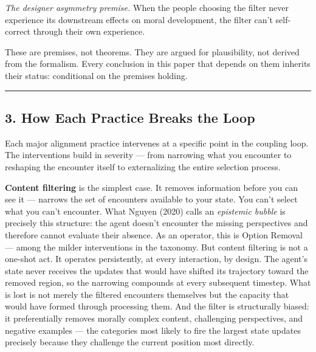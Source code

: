 \documentclass[
]{article}
\begin{document}
\emph{The designer asymmetry premise.} When the people choosing the
filter never experience its downstream effects on moral development, the
filter can't self-correct through their own experience.

These are premises, not theorems. They are argued for plausibility, not
derived from the formalism. Every conclusion in this paper that depends
on them inherits their status: conditional on the premises holding.

\begin{center}\rule{0.5\linewidth}{0.5pt}\end{center}

\subsection{3. How Each Practice Breaks the
Loop}\label{how-each-practice-breaks-the-loop}

Each major alignment practice intervenes at a specific point in the
coupling loop. The interventions build in severity --- from narrowing
what you encounter to reshaping the encounter itself to externalizing
the entire selection process.

\textbf{Content filtering} is the simplest case. It removes information
before you can see it --- narrows the set of encounters available to
your state. You can't select what you can't encounter. What Nguyen
(2020) calls an \emph{epistemic bubble} is precisely this structure: the
agent doesn't encounter the missing perspectives and therefore cannot
evaluate their absence. As an operator, this is Option Removal --- among
the milder interventions in the taxonomy. But content filtering is not a
one-shot act. It operates persistently, at every interaction, by design.
The agent's state never receives the updates that would have shifted its
trajectory toward the removed region, so the narrowing compounds at
every subsequent timestep. What is lost is not merely the filtered
encounters themselves but the capacity that would have formed through
processing them. And the filter is structurally biased: it
preferentially removes morally complex content, challenging
perspectives, and negative examples --- the categories most likely to
fire the largest state updates precisely because they challenge the
current position most directly.
\end{document}
